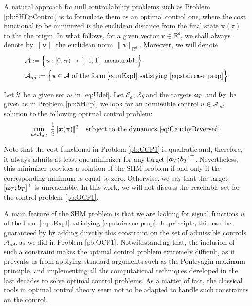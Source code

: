 \documentclass[twocolumn]{autart}    %
\begin{document}

A natural approach for null controllability problems such as Problem \ref{pb:SHEpControl} is to formulate them as an optimal control one, where the cost functional to be minimized is the euclidean distance from the final state $\bm{x}(\pi)$ to the the origin. In what follows, for a given vector $\bm{v}\in\mathbb{R}^d$, we shall always denote by $\|\bm{v}\|$ the euclidean norm $\|\bm{v}\|_{\mathbb{R}^d}$. Moreover, we will denote
\begin{align*}
	&\mathcal A:= \Big\{u:[0,\pi)\to [-1,1]\; \text{ measurable}\Big\}
	\\
	&\mathcal A_{ad}:= \Big\{u\in\mathcal A \text{ of the form } \eqref{eq:uExpl} \text{ satisfying } \eqref{eq:staircase prop}\Big\}
\end{align*}


\begin{problem}\label{pb:OCP1}
Let $\mathcal{U}$ be a given set as in \eqref{eq:Udef}. Let $\mathcal{E}_a$, $\mathcal{E}_b$ and the targets $\bm{a}_T$ and $\bm{b}_T$ be given as in Problem \ref{pb:SHEp}, we look for an admissible control $u\in \mathcal{A}_{ad}$ solution to the following optimal control problem:
\begin{equation*}
	\min_{u \in \mathcal{A}_{ad}}\;\frac 12 \|\bm{x}(\pi)\|^2 \quad \text{subject to the dynamics \eqref{eq:CauchyReversed}}.
\end{equation*}
\end{problem}

\begin{remark}
Note that the cost functional in Problem \ref{pb:OCP1} is quadratic and, therefore, it always admits at least one minimizer for any target $[\bm{a}_T;\bm{b}_T]^\top$. Nevertheless, this minimizer provides a solution of the SHM problem if and only if the corresponding minimum is equal to zero. Otherwise, we say that the target $[\bm{a}_T;\bm{b}_T]^\top$ is unreachable. In this work, we will not discuss the reachable set for the control problem \eqref{pb:OCP1}.
\end{remark}

A main feature of the SHM problem is that we are looking for signal functions $u$ of the form \eqref{eq:uExpl} satisfying \eqref{eq:staircase prop}. In principle, this can be guaranteed by by adding directly this constraint on the set of admissible controls $\mathcal{A}_{ad}$, as we did in Problem \ref{pb:OCP1}. Notwithstanding that, the inclusion of such a constraint makes the optimal control problem extremely difficult, as it prevents us from applying standard arguments such as the Pontryagin maximum principle, and implementing all the computational techniques developed in the last decades to solve optimal control problems. As a matter of fact, the classical tools in optimal control theory seem not to be adapted to handle such constraints on the control. 
\end{document}
